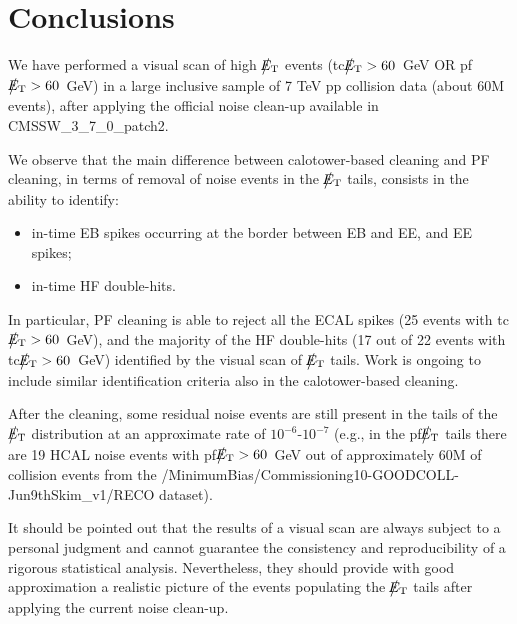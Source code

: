 \section{Conclusions}
We have performed a visual scan of high $\big\slash\hspace{-1.6ex}{E_\text{T}}$ events 
(tc$\big\slash\hspace{-1.6ex}{E_\text{T}}>60$~GeV OR pf$\big\slash\hspace{-1.6ex}{E_\text{T}}>60$~GeV)
in a large inclusive sample of 7 TeV pp collision data (about 60M events), 
after applying the official noise clean-up available in CMSSW\_3\_7\_0\_patch2.

We observe that the main difference between calotower-based cleaning and PF cleaning, in 
terms of removal of noise events in the $\big\slash\hspace{-1.6ex}{E_\text{T}}$ tails, consists in the ability to identify:
\begin{itemize}
\item in-time EB spikes occurring at the border between EB and EE, and EE spikes; 
\item in-time HF double-hits.
\end{itemize}

In particular, PF cleaning is able to reject all the ECAL spikes 
(25 events with tc$\big\slash\hspace{-1.6ex}{E_\text{T}}>60$~GeV), and the majority of the HF double-hits (17 out of 22 events with 
tc$\big\slash\hspace{-1.6ex}{E_\text{T}}>60$~GeV) identified by the visual scan of $\big\slash\hspace{-1.6ex}{E_\text{T}}$ tails.
Work is ongoing to include similar identification criteria also in the calotower-based cleaning.

After the cleaning, some residual noise events are still present in the tails 
of the $\big\slash\hspace{-1.6ex}{E_\text{T}}$ distribution at an approximate rate of $10^{-6}$-$10^{-7}$
(e.g., in the pf$\big\slash\hspace{-1.6ex}{E_\text{T}}$ tails there are 19 HCAL noise events with pf$\big\slash\hspace{-1.6ex}{E_\text{T}}>60$~GeV 
out of approximately 60M of collision events from 
the /MinimumBias/Commissioning10-GOODCOLL-Jun9thSkim\_v1/RECO dataset).

It should be pointed out that the results of a visual scan 
are always subject to a personal judgment and cannot guarantee 
the consistency and reproducibility of a rigorous statistical analysis. 
Nevertheless, they should provide with good approximation a realistic 
picture of the events populating the $\big\slash\hspace{-1.6ex}{E_\text{T}}$ tails after applying 
the current noise clean-up.



